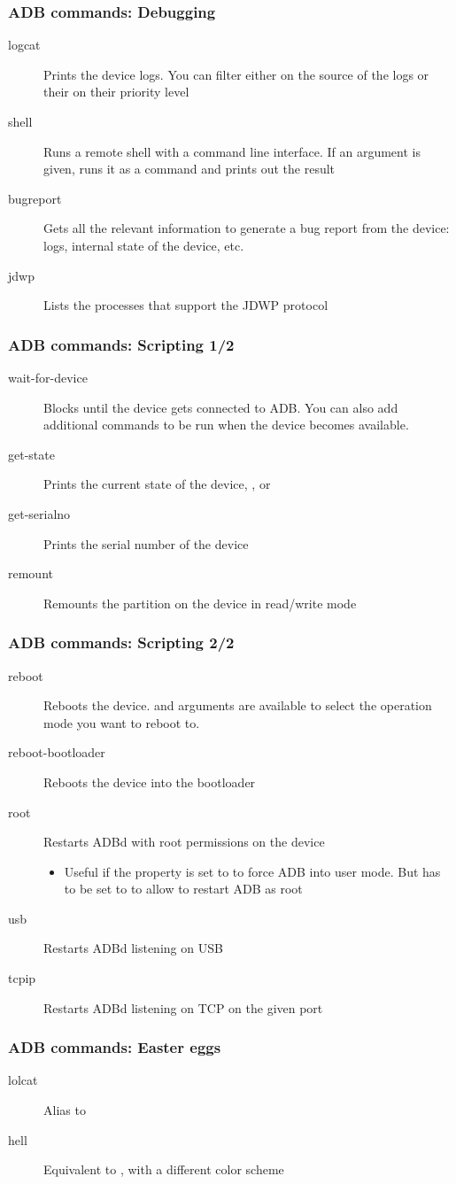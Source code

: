 \begin{frame}
  \frametitle{ADB commands: Debugging}
  \begin{description}
  \item[logcat] Prints the device logs. You can filter either on
    the source of the logs or their on their priority level
  \item[shell] Runs a remote shell with a command line interface. If an
    argument is given, runs it as a command and prints out the result
  \item[bugreport] Gets all the relevant information to generate a
    bug report from the device: logs, internal state of the device, etc.
  \item[jdwp] Lists the processes that support the JDWP protocol
  \end{description}
\end{frame}

\begin{frame}
  \frametitle{ADB commands: Scripting 1/2}
  \begin{description}
  \item[wait-for-device] Blocks until the device gets connected to
    ADB. You can also add additional commands to
    be run when the device becomes available.
  \item[get-state] Prints the current state of the device,
    ,  or 
  \item[get-serialno] Prints the serial number of the device
  \item[remount] Remounts the  partition on the device
    in read/write mode
  \end{description}
\end{frame}

\begin{frame}
  \frametitle{ADB commands: Scripting 2/2}
  \begin{description}
  \item[reboot] Reboots the device.  and
     arguments are available to select the operation
    mode you want to reboot to.
  \item[reboot-bootloader] Reboots the device into the bootloader
  \item[root] Restarts ADBd with root permissions on the device
    \begin{itemize}
    \item Useful if the  property is set to 
      to force ADB into user mode. But  has to
      be set to  to allow to restart ADB as root
    \end{itemize}
  \item[usb] Restarts ADBd listening on USB
  \item[tcpip] Restarts ADBd listening on TCP on the given port
  \end{description}
\end{frame}

\begin{frame}
  \frametitle{ADB commands: Easter eggs}
  \begin{description}
  \item[lolcat] Alias to 
  \item[hell] Equivalent to , with a different
    color scheme
  \end{description}
\end{frame}
